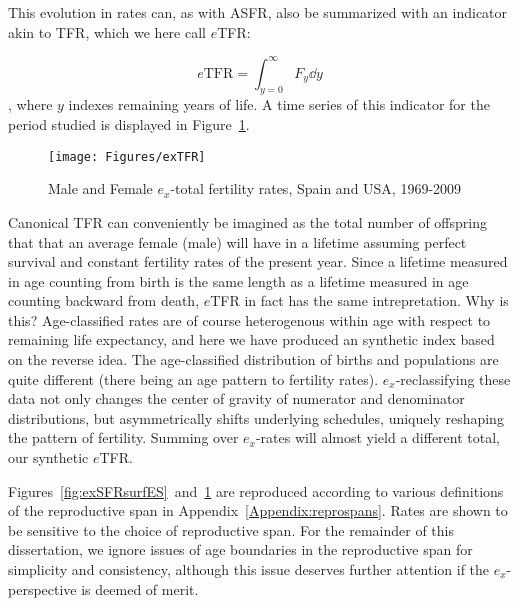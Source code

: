 \FloatBarrier
This evolution in rates can, as with ASFR, also be
summarized with an indicator akin to TFR, which we here call $e$TFR:

\begin{equation}
\label{eq:exTFR}
e\mathrm{TFR} = \int _{y=0}^\infty F_y \dd y
\end{equation}
, where $y$ indexes remaining years of life. A time series of this indicator
for the period studied is displayed in Figure~\ref{fig:exTFR}.

\begin{figure}[ht!]
        \centering  
          \caption{Male and Female $e_x$-total fertility rates, Spain
          and USA, 1969-2009}
           \texttt{[image: Figures/exTFR]}
          \label{fig:exTFR}
\end{figure}

Canonical TFR can conveniently be imagined as the total number of
offspring that that an average female (male) will have in a lifetime assuming
perfect survival and constant fertility rates of the present year.
Since a lifetime measured in age counting from birth is the same length as a
lifetime measured in age counting backward from death, $e$TFR in fact has the
same intrepretation. Why is this? Age-classified rates are of course
heterogenous within age with respect to remaining life expectancy, and here we have produced
an synthetic index based on the reverse idea. The age-classified
distribution of births and populations are quite different (there being an age
pattern to fertility rates). $e_x$-reclassifying these data not only changes the
center of gravity of numerator and denominator distributions, but asymmetrically
shifts underlying schedules, uniquely reshaping the pattern of
fertility. Summing over $e_x$-rates will almost yield a different total, our
synthetic $e$TFR. 

Figures~\ref{fig:exSFRsurfES}~and~\ref{fig:exTFR} are reproduced according to
various definitions of the reproductive span in
Appendix~\ref{Appendix:reprospans}. Rates are shown to be sensitive to the
choice of reproductive span. For the remainder of this dissertation, we ignore
issues of age boundaries in the reproductive span for simplicity and
consistency, although this issue deserves further attention if the
$e_x$-perspective is deemed of merit.